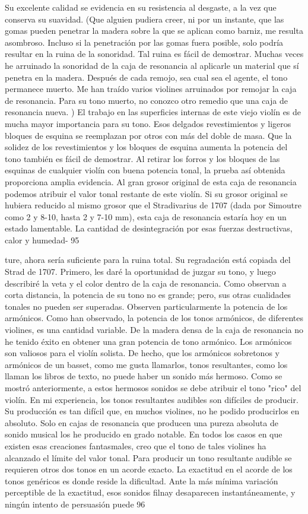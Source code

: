 Su excelente calidad se evidencia en su resistencia al desgaste, a la vez que conserva su suavidad.
(Que alguien pudiera creer, ni por un instante, que las gomas pueden penetrar la madera sobre la que se aplican como barniz, me resulta asombroso. Incluso si la penetración por las gomas fuera posible, solo podría resultar en la ruina de la sonoridad. Tal ruina es fácil de demostrar. Muchas veces he arruinado la sonoridad de la caja de resonancia al aplicarle un material que sí penetra en la madera. Después de cada remojo, sea cual sea el agente, el tono permanece muerto. Me han traído varios violines arruinados por remojar la caja de resonancia. Para su tono muerto, no conozco otro remedio que una caja de resonancia nueva. ) El trabajo en las superficies internas de este viejo violín es de mucha mayor importancia para su tono. Esos delgados revestimientos y ligeros bloques de esquina se reemplazan por otros con más del doble de masa. Que la solidez de los revestimientos y los bloques de esquina aumenta la potencia del tono también es fácil de demostrar. Al retirar los forros y los bloques de las esquinas de cualquier violín con buena potencia tonal, la prueba así obtenida proporciona amplia evidencia. Al gran grosor original de esta caja de resonancia podemos atribuir el valor tonal restante de este violín. Si su grosor original se hubiera reducido al mismo grosor que el Stradivarius de 1707 (dada por Simoutre como 2 y 8-10, hasta 2 y 7-10 mm), esta caja de resonancia estaría hoy en un estado lamentable. La cantidad de desintegración por esas fuerzas destructivas, calor y humedad-
95

ture, ahora sería suficiente para la ruina total. Su regradación está copiada del Strad de 1707. Primero, les daré la oportunidad de juzgar su tono, y luego describiré la veta y el color dentro de la caja de resonancia. Como observan a corta distancia, la potencia de su tono no es grande; pero, sus otras cualidades tonales no pueden ser superadas. Observen particularmente la potencia de los armónicos. Como han observado, la potencia de los tonos armónicos, de diferentes violines, es una cantidad variable. De la madera densa de la caja de resonancia no he tenido éxito en obtener una gran potencia de tono armónico. Los armónicos son valiosos para el violín solista. De hecho, que los armónicos sobretonos y armónicos de un basset, como me gusta llamarlos, tonos resultantes, como los llaman los libros de texto, no puede haber un sonido más hermoso. Como se mostró anteriormente, a estos hermosos sonidos se debe atribuir el tono "rico" del violín. En mi experiencia, los tonos resultantes audibles son difíciles de producir. Su producción es tan difícil que, en muchos violines, no he podido producirlos en absoluto. Solo en cajas de resonancia que producen una pureza absoluta de sonido musical los he producido en grado notable. En todos los casos en que existen esas creaciones fantasmales, creo que el tono de tales violines ha alcanzado el límite del valor tonal. Para producir un tono resultante audible se requieren otros dos tonos en un acorde exacto. La exactitud en el acorde de los tonos genéricos es donde reside la dificultad. Ante la más mínima variación perceptible de la exactitud, esos sonidos filnay desaparecen instantáneamente, y ningún intento de persuasión puede
96

